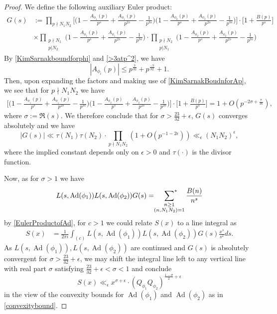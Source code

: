\documentclass[10pt,leqno]{amsart}
\theoremstyle{plain}
\theoremstyle{definition}
\theoremstyle{remark}
\numberwithin{equation}{section}
\newcommand{\psum}{\sideset{}{^*}\sum}
\newcommand{\Ad}{\operatorname{Ad}}
\begin{document}
\begin{proof}
    We define the following auxiliary Euler product:
    \begin{align*}
        G(s)  & := \prod_{p\nmid N_1N_2} \bigg[\bigg(1 - \frac{A_{\phi_1}(p)}{p^s} + \frac{A_{\phi_1}(p)}{p^{2s}} - \frac{1}{p^{3s}}\bigg) \bigg(1 - \frac{A_{\phi_2}(p)}{p^s} + \frac{A_{\phi_2}(p)}{p^{2s}} - \frac{1}{p^{3s}}\bigg)\bigg]\cdot \bigg[1 + \frac{B(p)}{p^s}\bigg] \\
        & \times \prod_{\substack{p\nmid N_1\\p|N_2}}\bigg(1 - \frac{A_{\phi_1}(p)}{p^s} + \frac{A_{\phi_1}(p)}{p^{2s}} - \frac{1}{p^{3s}}\bigg)\cdot 
        \prod_{\substack{p\nmid N_2\\p|N_1}}\bigg(1 - \frac{A_{\phi_2}(p)}{p^s} + \frac{A_{\phi_2}(p)}{p^{2s}} - \frac{1}{p^{3s}}\bigg)
    \end{align*}
    By \eqref{KimSarnakboundforphi} and \eqref{>3atp^2}, we have 
    \begin{equation}\label{KimSarnakBoudnforAp}
        |A_{\phi_i}(p)| \leq p^{\frac{7}{32}} + p^{\frac{-7}{32}} + 1.
    \end{equation}
    Then, upon expanding the factors and making use of \eqref{KimSarnakBoudnforAp}, we see that for $p\nmid N_1N_2$ we have
    \begin{align*}
        \bigg[\bigg(1 - \frac{A_{\phi_1}(p)}{p^s} + \frac{A_{\phi_1}(p)}{p^{2s}} - \frac{1}{p^{3s}}\bigg) \bigg(1 - \frac{A_{\phi_2}(p)}{p^s} + \frac{A_{\phi_2}(p)}{p^{2s}} - \frac{1}{p^{3s}}\bigg)\bigg]\cdot \bigg[1 + \frac{B(p)}{p^s}\bigg] 
        = 1 + O(p^{-2\sigma + \frac{7}{16}}),
    \end{align*}
    where $\sigma := \Re(s)$.
    We therefore conclude that for $\sigma > \frac{23}{32}+\epsilon$, $G(s)$ converges absolutely and we have
    \[
        |G(s)| \ll \tau(N_1)\tau(N_2)\cdot \prod_{p\nmid N_1N_2}(1 + O(p^{-1 - 2\epsilon})) \ll_{\epsilon} (N_1N_2)^{\epsilon},
    \]
    where the implied constant depends only on $\epsilon > 0$ and $\tau(\cdot)$ is the divisor function.
    
    Now, as for $\sigma > 1$ we have 
    \[
        L(s,\Ad(\phi_1))L(s,\Ad(\phi_2))G(s) = \psum_{\substack{n \geq 1 \\ (n,N_1N_2)=1}}\frac{B(n)}{n^s}
    \]
    by \eqref{EulerProductofAd}, for $c>1$ we could relate $S(x)$ to a line integral as
    \begin{align*}
        S(x) & = \frac{1}{2\pi i}\int_{(c)}L(s,\Ad(\phi_1))L(s,\Ad(\phi_2))G(s)\frac{x^s}{s^2}ds.
    \end{align*}
    As $L(s, \Ad(\phi_1)), L(s, \Ad(\phi_2))$ are continued and $G(s)$ is absolutely convergent for $\sigma > \frac{23}{32} + \epsilon$, we may shift the integral line left to any vertical line with real part $\sigma$ satisfying $\frac{23}{32} +\epsilon < \sigma <1$ and conclude
    \[
        S(x) \ll_{\epsilon} x^{\sigma+\epsilon}\cdot (Q_{\phi_1}Q_{\phi_2})^{\frac{1-\sigma}{2} + \epsilon}
    \]
    in the view of the convexity bounds for $\Ad(\phi_1)$ and $\Ad(\phi_2)$ as in \eqref{convexitybound}.
    
\end{proof}
\end{document}
